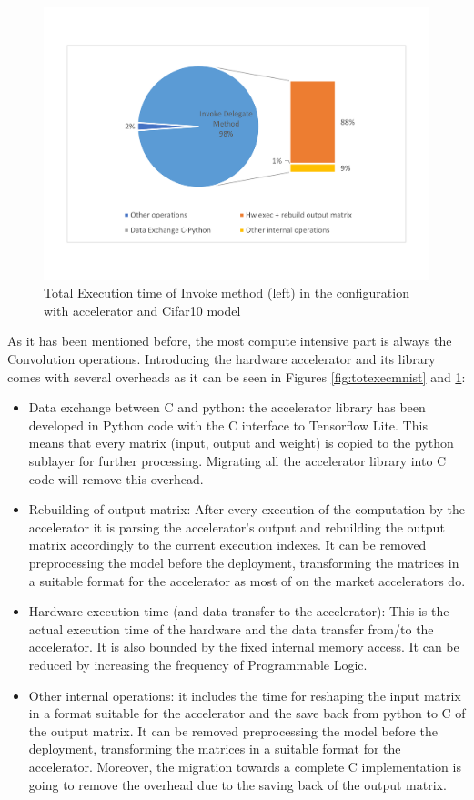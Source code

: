 \begin{figure}[!htbp]
\centering
\captionsetup{justification=centering}
\includegraphics[scale=0.55,angle=0]{./figure/graphs/latency_subdivision_cifar10.pdf}
\caption{Total Execution time of Invoke method (left) in the configuration with accelerator and Cifar10 model}
\label{fig:totexeccifar10}
\end{figure}
\newpage
As it has been mentioned before, the most compute intensive part is always the Convolution operations. Introducing the hardware accelerator and its library comes with several overheads as it can be seen in Figures \ref{fig:totexecmnist} and \ref{fig:totexeccifar10}:\\
\begin{itemize}
\item Data exchange between C and python: the accelerator library has been developed in Python code with the C interface to Tensorflow Lite. This means that every matrix (input, output and weight) is copied to the python sublayer for further processing. Migrating all the accelerator library into C code will remove this overhead.
\item Rebuilding of output matrix: After every execution of the computation by the accelerator it is parsing the accelerator's output and rebuilding the output matrix accordingly to the current execution indexes. It can be removed preprocessing the model before the deployment, transforming the matrices in a suitable format for the accelerator as most of on the market accelerators do.
\item Hardware execution time (and data transfer to the accelerator): This is the actual execution time of the hardware and the data transfer from/to the accelerator. It is also bounded by the fixed internal memory access. It can be reduced by increasing the frequency of Programmable Logic.
\item Other internal operations: it includes the time for reshaping the input matrix in a format suitable for the accelerator and the save back from python to C of the output matrix. It can be removed preprocessing the model before the deployment, transforming the matrices in a suitable format for the accelerator. Moreover, the migration towards a complete C implementation is going to remove the overhead due to the saving back of the output matrix.\\
\end{itemize}
